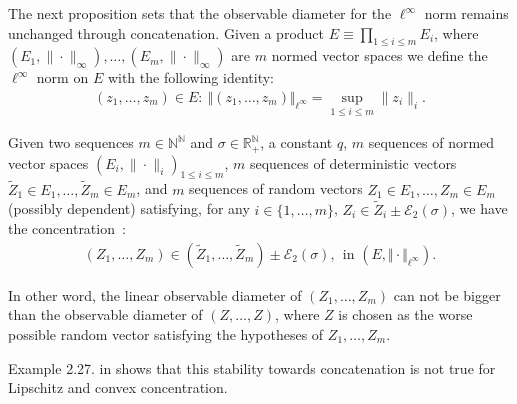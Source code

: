 \documentclass{ws-rmta}
\begin{document}
The next proposition sets that the observable diameter for the $\ell^\infty$ norm remains unchanged through concatenation. Given a product $E \equiv \prod_{1\leq i\leq m} E_i$, where $(E_1,\|\cdot\|_\infty), \ldots, (E_m,\|\cdot\|_\infty)$ are $m$ normed vector spaces we define the $\ell^\infty$ norm on $E$ with the following identity:
\begin{align}\label{eq:definition_l_infty}
  (z_1,\ldots ,z_m) \in E: \ \Vert (z_1,\ldots , z_m) \Vert_{\ell^\infty}  = \sup_{1\leq i \leq m} \| z_i\|_i.
\end{align}
\begin{proposition}\label{pro:concentration_concatenation_vecteurs_lineairement_concentres}
    Given two sequences $m \in \mathbb N^{\mathbb N}$ and $\sigma \in \mathbb R_+^{\mathbb N}$, a constant $q$, $m$ sequences of normed vector spaces $(E_i, \|\cdot\|_i)_{1\leq i \leq m}$, $m$ sequences of deterministic vectors $\tilde Z_1\in E_1,\ldots, \tilde Z_m\in E_m$, and $m$ sequences of random vectors $Z_1 \in E_1,\ldots,Z_m \in E_m$ (possibly dependent) satisfying, for any $i\in\{1,\ldots ,m\}$, $Z_i \in \tilde Z_i \pm \mathcal E_2(\sigma)$, we have the concentration~:%
  \begin{align*}
    (Z_1,\ldots,Z_m) \in (\tilde Z_1,\ldots, \tilde Z_m) \pm \mathcal E_2(\sigma),
     \ \ \text{in } (E, \Vert \cdot \Vert_{\ell^\infty}).
  \end{align*}
\end{proposition}
In other word, the linear observable diameter of $(Z_1,\ldots, Z_m)$ can not be bigger than the observable diameter of $(Z, \ldots,Z)$, where $Z$ is chosen as the worse possible random vector satisfying the hypotheses of $Z_1,\ldots, Z_m$.
\begin{remark}\label{rem:concatenation_impossible_concentration_convexe_ou_lipschitz}
  Example 2.27. in \cite{LOU19} shows that this stability towards concatenation is not true for Lipschitz and convex concentration.
\end{remark}
\end{document}
